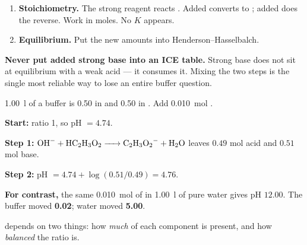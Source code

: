 \documentclass{apchem-notes}
\begin{document}


\begin{enumerate}[leftmargin=*,itemsep=0.3em]
  \item \textbf{Stoichiometry.} The strong reagent reacts
        . Added  converts  to
        ; added  does the reverse. Work in moles. No $K$
        appears.
  \item \textbf{Equilibrium.} Put the new amounts into
        Henderson--Hasselbalch.
\end{enumerate}

\begin{apctrap}
\textbf{Never put added strong base into an ICE table.} Strong base does not
sit at equilibrium with a weak acid --- it consumes it. Mixing the two steps
is the single most reliable way to lose an entire buffer question.
\end{apctrap}

\begin{workedexample}
\SI{1.00}{\litre} of a buffer is \SI{0.50}{\Molar} in  and
\SI{0.50}{\Molar} in . Add \SI{0.010}{\mole} .

\textbf{Start:} ratio 1, so pH $= 4.74$.

\textbf{Step 1:} $\ce{OH^- + HC2H3O2 -> C2H3O2^- + H2O}$ leaves
$0.49$ mol acid and $0.51$ mol base.

\textbf{Step 2:} pH $= 4.74 + \log(0.51/0.49) = \mathbf{4.76}$.

\textbf{For contrast,} the same \SI{0.010}{\mole} of  in
\SI{1.00}{\litre} of pure water gives pH $\mathbf{12.00}$. The buffer moved
\textbf{0.02}; water moved \textbf{5.00}.
\end{workedexample}



 depends on two things: how \emph{much} of each
component is present, and how \emph{balanced} the ratio is.

\begin{center}
\end{center}
\end{document}
